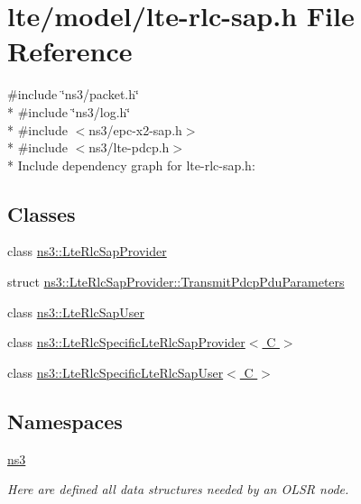 \hypertarget{lte-rlc-sap_8h}{}\section{lte/model/lte-\/rlc-\/sap.h File Reference}
\label{lte-rlc-sap_8h}
{\ttfamily \#include \char`\"{}ns3/packet.\+h\char`\"{}}\\*
{\ttfamily \#include \char`\"{}ns3/log.\+h\char`\"{}}\\*
{\ttfamily \#include $<$ns3/epc-\/x2-\/sap.\+h$>$}\\*
{\ttfamily \#include $<$ns3/lte-\/pdcp.\+h$>$}\\*
Include dependency graph for lte-\/rlc-\/sap.h\+:
\subsection*{Classes}
\begin{DoxyCompactItemize}
\item 
class \hyperlink{classns3_1_1LteRlcSapProvider}{ns3\+::\+Lte\+Rlc\+Sap\+Provider}
\item 
struct \hyperlink{structns3_1_1LteRlcSapProvider_1_1TransmitPdcpPduParameters}{ns3\+::\+Lte\+Rlc\+Sap\+Provider\+::\+Transmit\+Pdcp\+Pdu\+Parameters}
\item 
class \hyperlink{classns3_1_1LteRlcSapUser}{ns3\+::\+Lte\+Rlc\+Sap\+User}
\item 
class \hyperlink{classns3_1_1LteRlcSpecificLteRlcSapProvider}{ns3\+::\+Lte\+Rlc\+Specific\+Lte\+Rlc\+Sap\+Provider$<$ C $>$}
\item 
class \hyperlink{classns3_1_1LteRlcSpecificLteRlcSapUser}{ns3\+::\+Lte\+Rlc\+Specific\+Lte\+Rlc\+Sap\+User$<$ C $>$}
\end{DoxyCompactItemize}
\subsection*{Namespaces}
\begin{DoxyCompactItemize}
\item 
 \hyperlink{namespacens3}{ns3}
\begin{DoxyCompactList}\small\item\em Here are defined all data structures needed by an O\+L\+SR node. \end{DoxyCompactList}\end{DoxyCompactItemize}
